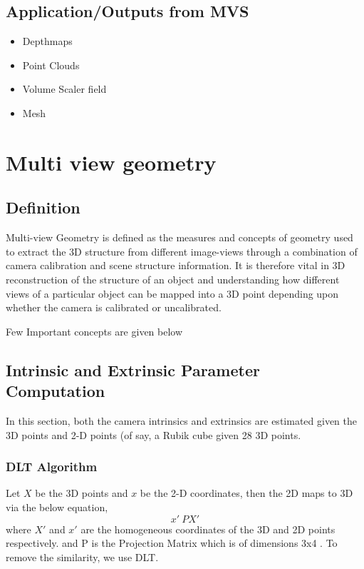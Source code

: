 \documentclass{article}[11pt]
\begin{document}
\subsection{Application/Outputs from MVS}
\begin{itemize}
    \item Depthmaps
    \item Point Clouds
    \item Volume Scaler field
    \item Mesh
\end{itemize}

\section{Multi view geometry}
\subsection{Definition}
Multi-view Geometry is defined as the measures and concepts of geometry used to extract the 3D structure from different image-views through a combination of camera calibration and scene structure information. It is therefore vital in 3D reconstruction of the structure of an object and understanding how different views of a particular object can be mapped into a 3D point depending upon whether the camera is calibrated or uncalibrated. 

Few Important concepts are given below

\subsection{Intrinsic and Extrinsic Parameter Computation}


In this section, both the camera intrinsics and extrinsics are estimated given the 3D points and 2-D points (of say, a Rubik cube given 28 3D points.  


\subsubsection{ DLT Algorithm}

Let $X$ be the 3D points and $x$ be the 2-D coordinates, then the 2D maps to 3D via the below equation,
\begin{equation}
    x' ~ P X'
\end{equation}
where $X'$ and $x'$ are the homogeneous coordinates of the 3D and 2D points respectively.
and P is the Projection Matrix which is of dimensions 3x4 . 
To remove the similarity, we use DLT. 
\end{document}
